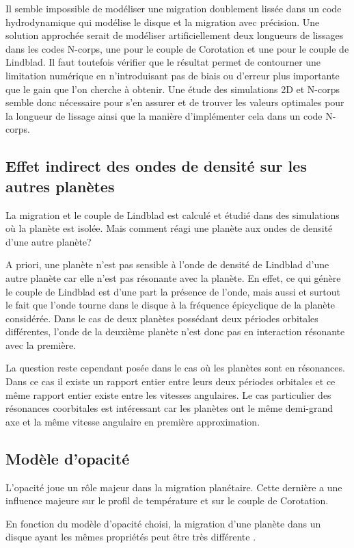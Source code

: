 Il semble impossible de modéliser une migration doublement lissée dans un code hydrodynamique qui modélise le disque et la migration avec précision. Une solution approchée serait de modéliser artificiellement deux longueurs de lissages dans les codes N-corps, une pour le couple de Corotation et une pour le couple de Lindblad. Il faut toutefois vérifier que le résultat permet de contourner une limitation numérique en n'introduisant pas de biais ou d'erreur plus importante que le gain que l'on cherche à obtenir. Une étude des simulations 2D et N-corps semble donc nécessaire pour s'en assurer et de trouver les valeurs optimales pour la longueur de lissage ainsi que la manière d'implémenter cela dans un code N-corps. 

\subsection{Effet indirect des ondes de densité sur les autres planètes}
La migration et le couple de Lindblad est calculé et étudié dans des simulations où la planète est isolée. Mais comment réagi une planète aux ondes de densité d'une autre planète? 

A priori, une planète n'est pas sensible à l'onde de densité de Lindblad d'une autre planète car elle n'est pas résonante avec la planète. En effet, ce qui génère le couple de Lindblad est d'une part la présence de l'onde, mais aussi et surtout le fait que l'onde tourne dans le disque à la fréquence épicyclique de la planète considérée. Dans le cas de deux planètes possédant deux périodes orbitales différentes, l'onde de la deuxième planète n'est donc pas en interaction résonante avec la première. 

La question reste cependant posée dans le cas où les planètes sont en résonances. Dans ce cas il existe un rapport entier entre leurs deux périodes orbitales et ce même rapport entier existe entre les vitesses angulaires. Le cas particulier des résonances coorbitales est intéressant car les planètes ont le même demi-grand axe et la même vitesse angulaire en première approximation.

\subsection{Modèle d'opacité}
L'opacité joue un rôle majeur dans la migration planétaire. Cette dernière a une influence majeure sur le profil de température et sur le couple de Corotation. 

En fonction du modèle d'opacité choisi, la migration d'une planète dans un disque ayant les mêmes propriétés peut être très différente . 

